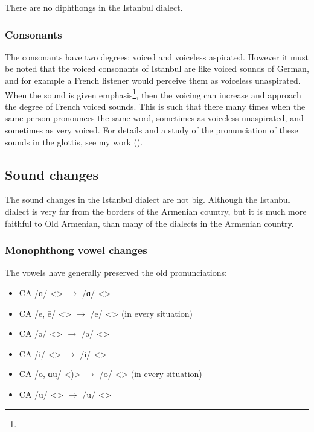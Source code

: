 \begin{adjarianpage}\label{page:250}\end{adjarianpage}%


There are no diphthongs in the Istanbul dialect.

\subsubsection{Consonants}\label{section:istanbul:phono:inventory:cons}

The consonants have two degrees: voiced and voiceless aspirated. However it must be noted that the voiced consonants of Istanbul are like voiced sounds of German, and for example a French listener would perceive them as voiceless unaspirated. When the sound is given emphasis\footnote{}, then the voicing can increase and approach the degree of French voiced sounds. This is such that there many times when the same person pronounces the same word, sometimes as voiceless unaspirated, and sometimes as very voiced. For details and a study of the pronunciation of these sounds in the glottis, see my work \citep{Adjarian-1899-ArmenianExplosives} (). 

\subsection{Sound changes}\label{sec:Istanbul:phono:soundchange}
The sound changes in the Istanbul dialect are not big. Although the Istanbul dialect is very far from the borders of the Armenian country, but it is much more faithful to Old Armenian, than many of the dialects in the Armenian country. 

\subsubsection{Monophthong vowel changes}

The vowels have generally preserved the old pronunciations:
\begin{itemize}
	\item CA /ɑ/ <> $\rightarrow$ /ɑ/ <> 
	\item CA /e, ē/ <> $\rightarrow$ /e/ <> (in every situation)
	\item CA /ə/ <> $\rightarrow$ /ə/ <> 
	\item CA /i/ <> $\rightarrow$ /i/ <> 
	\item CA /o, ɑu̯/ <)> $\rightarrow$ /o/ <> (in every situation)
	\item CA /u/ <> $\rightarrow$ /u/ <> 
\end{itemize}

